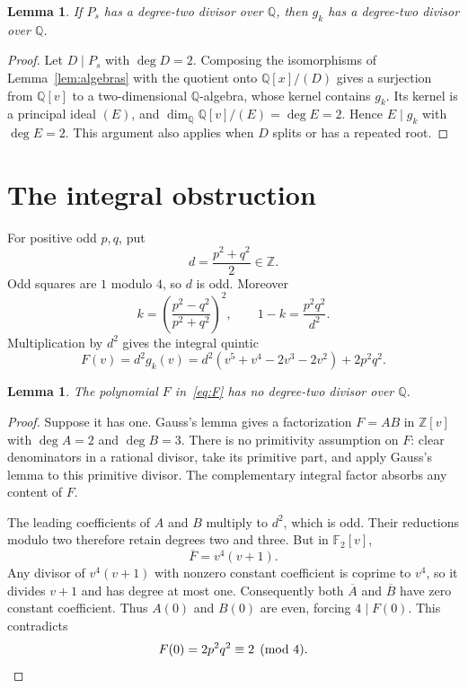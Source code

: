\documentclass[11pt]{article}
\newcommand{\Q}{\mathbb Q}
\newcommand{\Z}{\mathbb Z}
\newcommand{\F}{\mathbb F}
\newtheorem{lemma}[theorem]{Lemma}
\begin{document}
\begin{lemma}\label{lem:degree}
If $P_s$ has a degree-two divisor over $\Q$, then $g_k$ has a degree-two
divisor over $\Q$.
\end{lemma}
\begin{proof}
Let $D\mid P_s$ with $\deg D=2$. Composing the isomorphisms of
Lemma~\ref{lem:algebras} with the quotient onto $\Q[x]/(D)$ gives a
surjection from $\Q[v]$ to a two-dimensional $\Q$-algebra, whose kernel
contains $g_k$. Its kernel is a principal ideal $(E)$, and
$\dim_{\Q}\Q[v]/(E)=\deg E=2$. Hence $E\mid g_k$ with $\deg E=2$.
This argument also applies when $D$ splits or has a repeated root.
\end{proof}

\section{The integral obstruction}
For positive odd $p,q$, put
\[
d=\frac{p^2+q^2}{2}\in\Z.
\]
Odd squares are $1$ modulo $4$, so $d$ is odd. Moreover
\[
k=\left(\frac{p^2-q^2}{p^2+q^2}\right)^2,
\qquad 1-k=\frac{p^2q^2}{d^2}.
\]
Multiplication by $d^2$ gives the integral quintic
\begin{equation}\label{eq:F}
F(v)=d^2g_k(v)
=d^2(v^5+v^4-2v^3-2v^2)+2p^2q^2.
\end{equation}

\begin{lemma}\label{lem:modular}
The polynomial $F$ in~\eqref{eq:F} has no degree-two divisor over $\Q$.
\end{lemma}
\begin{proof}
Suppose it has one. Gauss's lemma gives a factorization $F=A B$ in $\Z[v]$
with $\deg A=2$ and $\deg B=3$. There is no primitivity assumption on $F$:
clear denominators in a rational divisor, take its primitive part, and apply
Gauss's lemma to this primitive divisor. The complementary integral factor
absorbs any content of $F$.

The leading coefficients of $A$ and $B$ multiply to $d^2$, which is odd.
Their reductions modulo two therefore retain degrees two and three.
But in $\F_2[v]$,
\[
\overline F=v^4(v+1).
\]
Any divisor of $v^4(v+1)$ with nonzero constant coefficient is coprime to
$v^4$, so it divides $v+1$ and has degree at most one. Consequently both
$\overline A$ and $\overline B$ have zero constant coefficient. Thus $A(0)$
and $B(0)$ are even, forcing $4\mid F(0)$. This contradicts
\[
F(0)=2p^2q^2\equiv2\pmod4.\qedhere
\]
\end{proof}
\end{document}
